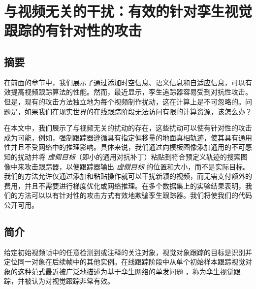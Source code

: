 \chapter{与视频无关的干扰：有效的针对孪生视觉跟踪的有针对性的攻击} \label{chap:attack}

\section{摘要}
在前面的章节中，我们展示了通过添加时空信息、语义信息和自适应信息，可以有效提高视频跟踪算法的性能。然而，最近显示，孪生追踪器容易受到对抗性攻击。但是，现有的攻击方法独立地为每个视频制作扰动，这在计算上是不可忽略的。问题是，如果我们在现实世界的在线跟踪阶段无法访问有限的计算资源，该怎么办？

在本文中，我们展示了与视频无关的扰动的存在，这些扰动可以使有针对性的攻击成为可能，例如，强制跟踪器遵循具有指定偏移量的地面真相轨迹，使其具有通用性并且不受网络中的推理影响。具体来说，我们通过向模板图像添加通用的不可感知的扰动并将 \textit{虚假目标}（即小的通用对抗补丁）粘贴到符合预定义轨迹的搜索图像中来攻击跟踪器，以便跟踪器输出 \textit{虚假目标} 的位置和大小，而不是实际目标。我们的方法允许仅通过添加和粘贴操作就可以干扰新颖的视频，而无需支付额外的费用，并且不需要进行梯度优化或网络推理。在多个数据集上的实验结果表明，我们的方法可以以有针对性的攻击方式有效地欺骗孪生跟踪器。我们将使我们的代码公开可用。

\section{简介}

给定初始视频帧中的任意检测到或注释的关注对象，视觉对象跟踪的目标是识别并定位同一对象在后续帧中的其他实例。在线跟踪阶段中从单个初始样本跟踪视觉对象的这种范式最近被广泛地描述为基于孪生网络的单发问题 \cite{SiamFC,SiamRPN,SiamRPN++,SiamFC++}，称为孪生视觉跟踪，并被认为对视觉跟踪非常有效。


